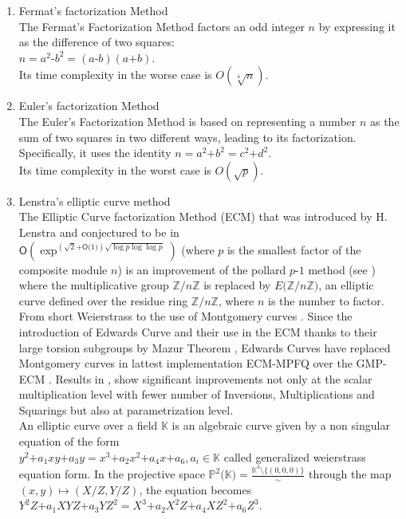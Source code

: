 \documentclass[sigconf,balance=false]{acmart}
\begin{document}
\begin{enumerate}
\item Fermat's factorization Method \ \\
The Fermat's Factorization Method factors an odd integer 
$n$ by expressing it as the difference of two squares:\\ $n=a^{2}\text{-}b^{2}=\left(a\text{-}b\right)\left(a\text{+}b\right)$.\\ Its time complexity in the worse case is $\displaystyle O\left(\sqrt[4]{n} \right)$. \\
\item Euler's factorization Method \\
The Euler's Factorization Method is based on representing a number $n$ as the sum of two squares in two different ways, leading to its factorization. Specifically, it uses the identity $n=a^2\text{+}b^2=c^2\text{+}d^2$.\\
Its time complexity in the worst case is $O\left(\sqrt{p} \right)$. \\
\item Lenstra's elliptic curve method \ \\
The Elliptic Curve factorization Method (ECM) that was introduced by H. Lenstra \cite{ecm} and conjectured to be in\\ $\displaystyle \mathsf{O}\left(\exp^{(\sqrt{2}\text{+}\mathsf{O}\text{(}1\text{)})\sqrt{ \log p \log\log p}}\right)$ (where $p$ is the smallest factor of the composite module $n$)
is an improvement of the pollard $p\text{-}1$ method (see \cite{pol}) where the multiplicative group $\mathbb{Z}\text{/}n\mathbb{Z}$ is replaced by $E\text{(}\mathbb{Z}\text{/}n\mathbb{Z}\text{)}$, an elliptic curve defined over the residue ring $\mathbb{Z}\text{/}n\mathbb{Z}$, where $n$ is the number to factor.\\ 
From short Weierstrass to the use of Montgomery curves \cite{mont}. Since the introduction of Edwards Curve \cite{eced} and their use  in the ECM \cite{ed} thanks to their large torsion subgroups by Mazur Theorem \cite{maz}, Edwards Curves have replaced Montgomery curves in lattest implementation ECM-MPFQ \cite{mpfq} over the GMP-ECM \cite{gmp}. Results in \cite{dt1, dt2, dt3, dt4, dt5, dt6, dt7, dt8}, show significant improvements not only at the scalar multiplication level with fewer number of Inversions, Multiplications and Squarings but also at parametrization level.\\
An elliptic curve over a field $\mathbb{K}$ is an algebraic curve given by a non singular equation of the form\\
 $y^{2}\text{+}a_{1}xy\text{+}a_{3}y=x^{3}\text{+}a_{2}x^{2}\text{+}a_{4}x\text{+}a_{6}, a_{i}\in \mathbb{K}$ called generalized weierstrass equation form. In the projective space $\mathbb{P}^{2}\text{(}\mathbb{K}\text{)}=\displaystyle \frac{\mathbb{K}^{3}\setminus \lbrace (0, 0, 0)\rbrace}{\sim}$ through the map $ \left(x, y\right)\longmapsto \left(X\text{/}Z, Y\text{/}Z\right)$, the equation becomes\\ $Y^{2}Z\text{+}a_{1}XYZ\text{+}a_{3}YZ^{2}=X^{3}\text{+}a_{2}X^{2}Z\text{+}a_{4}XZ^{2}\text{+}a_{6}Z^{3}$.\\

\end{enumerate}
\end{document}
